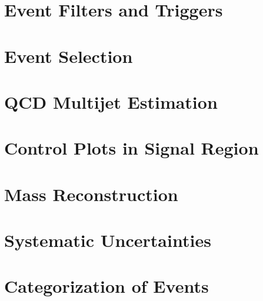 \newpage
\section{Event Filters and Triggers}
\label{s:secFilters}


\section{Event Selection}
\label{s:secEvtSel}


\newpage
\section{QCD Multijet Estimation}
\label{s:secQCD}


\newpage
\section{Control Plots in Signal Region}
\label{s:secCPlots}


\newpage
\section{Mass Reconstruction}
\label{s:secMassReco}


\newpage
\section{Systematic Uncertainties}
\label{s:secSys}


\newpage
\section{Categorization of Events}
\label{s:secMjjCat}


